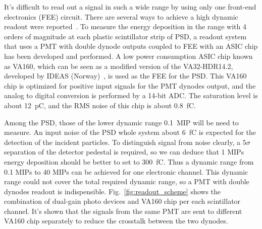 \documentclass[5p, times]{elsarticle}
\begin{document}
It's difficult to read out a signal in such a wide range by using only one front-end electronics (FEE) circuit. 
There are several ways to achieve a high dynamic readout were reported~\cite{katayose2008development,kampert1994high,zhang2012high}. 
To measure the energy deposition in the range with 4 orders of magnitude at each plastic scintillator strip of PSD, a readout system that uses a PMT with double dynode outputs coupled to FEE with an ASIC chip has been developed and performed. 
A low power consumption ASIC chip known as VA160, which can be seen as a modified version of the VA32-HDR14.2, developed by IDEAS (Norway)~\cite{va160}, is used as the FEE for the PSD. 
This VA160 chip is optimized for positive input signals for the PMT dynodes output, and the analog to digital conversion is performed by a 14-bit ADC. 
The saturation level is about \SI{12}{\pico\coulomb}, and the RMS noise of this chip is about \SI{0.8}{\femto\coulomb}.

Among the PSD, those of the lower dynamic range \SI{0.1}{MIP} will be need to measure. 
An input noise of the PSD whole system about \SI{6}{\femto\coulomb} is expected for the detection of the incident particles. 
To distinguish signal from noise clearly, a $5\sigma$ separation of the detector pedestal is required, so we can deduce that 1 MIPs energy deposition should be better to set to \SI{300}{\femto\coulomb}. 
Thus a dynamic range from 0.1 MIPs to 40 MIPs can be achieved for one electronic channel.
This dynamic range could not cover the total required dynamic range, so a PMT with double dynodes readout is indispensible. 
Fig.~\ref{fig:readout_scheme} shows the combination of dual-gain photo devices and VA160 chip per each scintillator channel.
It’s shown that the signals from the same PMT are sent to different VA160 chip separately to reduce the crosstalk between the two dynodes.
\end{document}
